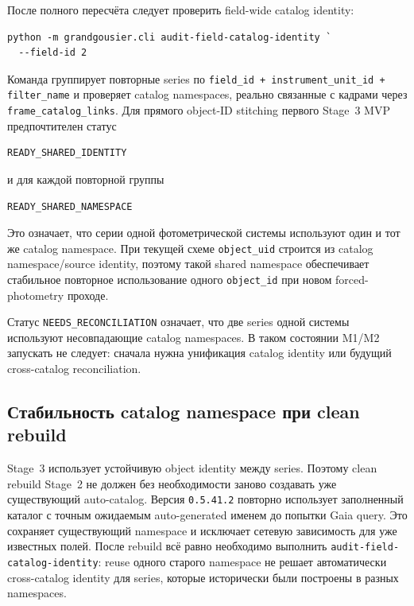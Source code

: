 После полного пересчёта следует проверить field-wide catalog identity:

\begin{lstlisting}
python -m grandgousier.cli audit-field-catalog-identity `
  --field-id 2
\end{lstlisting}

Команда группирует повторные series по \texttt{field\_id + instrument\_unit\_id + filter\_name} и проверяет catalog namespaces, реально связанные с кадрами через \texttt{frame\_catalog\_links}. Для прямого object-ID stitching первого Stage~3 MVP предпочтителен статус

\begin{lstlisting}
READY_SHARED_IDENTITY
\end{lstlisting}

и для каждой повторной группы

\begin{lstlisting}
READY_SHARED_NAMESPACE
\end{lstlisting}

Это означает, что серии одной фотометрической системы используют один и тот же catalog namespace. При текущей схеме \texttt{object\_uid} строится из catalog namespace/source identity, поэтому такой shared namespace обеспечивает стабильное повторное использование одного \texttt{object\_id} при новом forced-photometry проходе.

Статус \texttt{NEEDS\_RECONCILIATION} означает, что две series одной системы используют несовпадающие catalog namespaces. В таком состоянии M1/M2 запускать не следует: сначала нужна унификация catalog identity или будущий cross-catalog reconciliation.


\subsection{Стабильность catalog namespace при clean rebuild}

Stage~3 использует устойчивую object identity между series. Поэтому clean rebuild Stage~2 не должен без необходимости заново создавать уже существующий auto-catalog. Версия \texttt{0.5.41.2} повторно использует заполненный каталог с точным ожидаемым auto-generated именем до попытки Gaia query. Это сохраняет существующий namespace и исключает сетевую зависимость для уже известных полей. После rebuild всё равно необходимо выполнить \texttt{audit-field-catalog-identity}: reuse одного старого namespace не решает автоматически cross-catalog identity для series, которые исторически были построены в разных namespaces.

